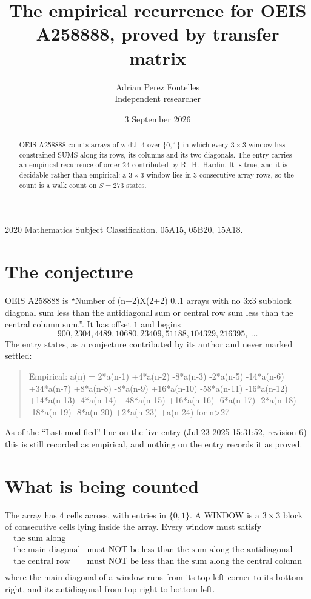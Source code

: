 \documentclass[11pt,a4paper]{article}
\title{The empirical recurrence for OEIS A258888, proved by transfer matrix}
\author{Adrian Perez Fontelles\\ \small Independent researcher}
\date{3 September 2026}
\theoremstyle{plain}
\theoremstyle{definition}
\begin{document}
\maketitle

\begin{abstract}
OEIS A258888 counts arrays of width $4$ over $\{0,1\}$ in which every $3\times3$ window has
constrained SUMS along its rows, its columns and its two diagonals. The entry carries an
empirical recurrence of order $24$ contributed by R.~H.~Hardin. It is true, and it is
decidable rather than empirical: a $3\times3$ window lies in $3$ consecutive array rows,
so the count is a walk count on $S=273$ states.
\end{abstract}

\noindent\small 2020 Mathematics Subject Classification. 05A15, 05B20, 15A18.\normalsize

\section{The conjecture}

OEIS A258888 is ``Number of (n+2)X(2+2) 0..1 arrays with no 3x3 subblock diagonal sum less than the antidiagonal sum or central row sum less than the central column sum.''. It has offset $1$ and begins
\[
900, 2304, 4489, 10680, 23409, 51188, 104329, 216395,\ \dots
\]
The entry states, as a conjecture contributed by its author and never marked settled:
\begin{quote}
Empirical: a(n) = 2*a(n-1) +4*a(n-2) -8*a(n-3) -2*a(n-5) -14*a(n-6) +34*a(n-7) +8*a(n-8) -8*a(n-9) +16*a(n-10) -58*a(n-11) -16*a(n-12) +14*a(n-13) -4*a(n-14) +48*a(n-15) +16*a(n-16) -6*a(n-17) -2*a(n-18) -18*a(n-19) -8*a(n-20) +2*a(n-23) +a(n-24) for n>27
\end{quote}
As of the ``Last modified'' line on the live entry (Jul 23 2025 15:31:52, revision 6) this is still
recorded as empirical, and nothing on the entry records it as proved.

\section{What is being counted}

The array has $4$ cells across, with entries in $\{0,1\}$. A WINDOW is a $3\times3$ block
of consecutive cells lying inside the array. Every window must satisfy
\[
\begin{array}{ll}
\text{the sum along} & \text{} \\[2pt]
\text{the main diagonal} & \text{must NOT be less than the sum along the antidiagonal} \\
\text{the central row} & \text{must NOT be less than the sum along the central column} \\
\end{array}
\]
where the main diagonal of a window runs from its top left corner to its bottom right, and its
antidiagonal from top right to bottom left.
\end{document}
